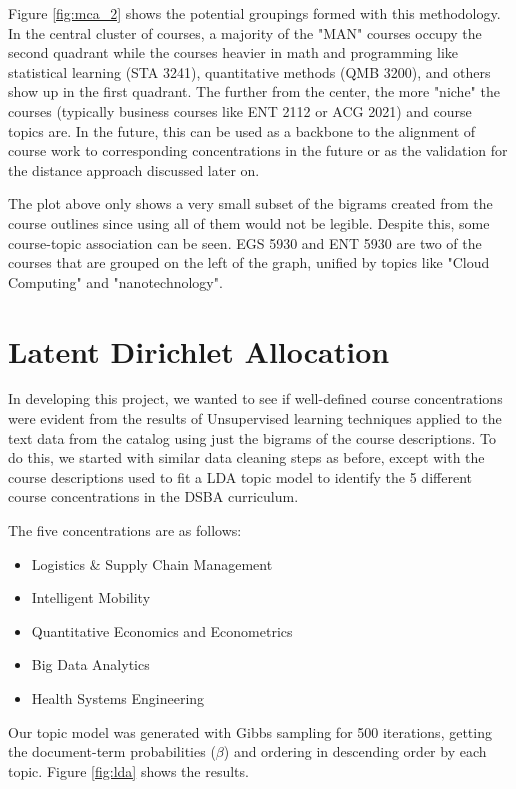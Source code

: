 Figure \ref{fig:mca_2} shows the potential groupings formed with this methodology.  In the central cluster of courses, a majority of the "MAN" courses occupy 
the second quadrant while the courses heavier in math and programming like statistical learning (STA 3241),  quantitative methods (QMB 3200), and others show 
up in the first quadrant.  The further from the center, the more "niche" the courses (typically business courses like ENT 2112 or ACG 2021) and course topics are.  
In the future, this can be used as a backbone to the alignment of course work to corresponding concentrations in the future or as the validation for the 
distance approach discussed later on. 

The plot above only shows a very small subset of the bigrams created from the course outlines since using all of them would not be legible.  Despite this,  
some course-topic association can be seen. EGS 5930 and ENT 5930 are two of the courses that are grouped on the left of the graph, unified by topics like "Cloud Computing" and 
"nanotechnology". 

\section{Latent Dirichlet Allocation}

In developing this project, we wanted to see if well-defined course concentrations were evident from the results of Unsupervised learning techniques applied 
to the text data from the catalog using just the bigrams of the course descriptions.  To do this,  we started with similar data cleaning steps as before, except 
with the course descriptions used to fit a LDA \cite{lda_pap} topic model to identify the 5 different course concentrations in the DSBA curriculum. 

The five concentrations are as follows:   
\begin{itemize}
	\item{Logistics \& Supply Chain Management }
	\item{Intelligent Mobility}
	\item{Quantitative Economics and Econometrics}
	\item{Big Data Analytics}
	\item{Health Systems Engineering}

\end{itemize}

Our topic model was generated with Gibbs sampling for 500 iterations,  getting the document-term probabilities ($\beta$) and ordering in descending order by 
each topic. Figure \ref{fig:lda} shows the results.


